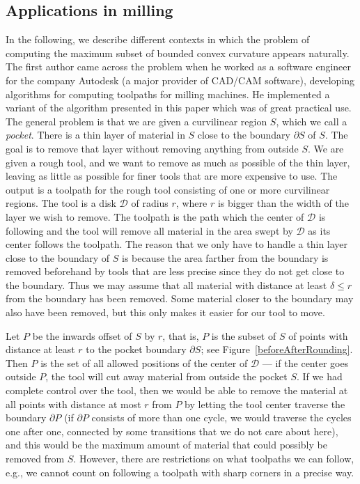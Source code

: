 \documentclass{article}
\newcommand{\PP}{P}
\newcommand{\cutdisk}{\mathcal D}
\newcommand{\tool}{\cutdisk}
\begin{document}
\subsection{Applications in milling}
In the following, we describe different contexts in which the problem of computing the maximum subset of bounded convex curvature appears naturally.
The first author came across the problem when he worked as a software engineer for the company Autodesk (a major provider of CAD/CAM software), developing algorithms for computing toolpaths for milling machines.
He implemented a variant of the algorithm presented in this paper which was of great practical use.
The general problem is that we are given a curvilinear region $S$, which we call a \emph{pocket}.
There is a thin layer of material in $S$ close to the boundary
$\partial S$ of $S$. The goal is to remove that layer without removing anything from outside $S$. We are given a rough
tool, and we want to remove as much as possible of the thin layer, leaving as little as
possible for finer tools that are more expensive to use. The output is
a toolpath for the rough tool consisting of one or more curvilinear
regions. The tool is a disk $\tool$ of radius $r$, where $r$ is
bigger than the width of the layer we wish to remove.  The toolpath is
the path which the center of $\tool$ is following and the tool will remove all material in the area swept by $\tool$ as its center follows the toolpath.
The reason that we only have to handle a thin layer close to the boundary of $S$ is because the area farther from the boundary is removed beforehand by tools
that are less precise since they do not get close to the boundary.
Thus we may assume that all material with distance at least $\delta\leq r$ from the boundary has been removed.
Some material closer to the boundary may also have been removed, but this only makes it easier for our tool to move.

Let $\PP$ be the inwards offset of $S$ by $r$, that is, $\PP$ is the subset of $S$ of points with distance at least $r$ to the pocket boundary $\partial S$; see Figure~\ref{beforeAfterRounding}.
Then $\PP$ is the set of all allowed positions of the center of $\tool$ --- if the center goes outside $\PP$, the tool will cut away material from outside the pocket $S$.
If we had complete control over the tool, then we would be able to remove the material at all points with distance at most $r$ from $\PP$ by letting the tool center traverse the boundary $\partial\PP$ (if $\partial\PP$ consists of more than one cycle, we would traverse the cycles one after one, connected by some transitions that we do not care about here), and this would be the maximum amount of material that could possibly be removed from $S$.
However, there are restrictions on what toolpaths we can follow, e.g., we cannot count on following a toolpath with sharp corners in a precise way.
\end{document}

